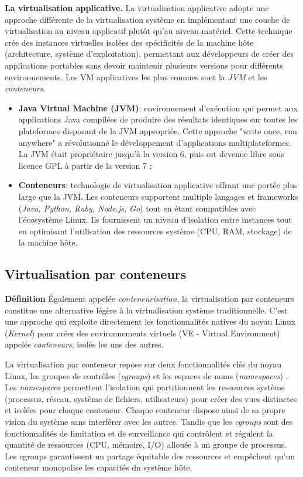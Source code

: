 \textbf{La virtualisation applicative.}
La virtualisation applicative adopte une approche différente de la virtualisation système en implémentant une couche de virtualisation au niveau applicatif plutôt qu'au niveau matériel. Cette technique crée des instances virtuelles isolées des spécificités de la machine hôte (architecture, système d'exploitation), permettant aux développeurs de créer des applications portables sans devoir maintenir plusieurs versions pour différents environnements.
Les VM applicatives les plus connues sont la \textit{JVM} et les \textit{conteneurs}.
\begin{itemize}
    \item \textbf{Java Virtual Machine (JVM)}: environnement d'exécution qui permet aux applications Java compilées de produire des résultats identiques sur toutes les plateformes disposant de la JVM appropriée. Cette approche "write once, run anywhere" a révolutionné le développement d'applications multiplateformes. La JVM était propriétaire jusqu'à la version 6, puis est devenue libre sous licence GPL à partir de la version 7 \cite{jayasena2015auto};
    \item \textbf{Conteneurs}: technologie de virtualisation applicative offrant une portée plus large que la JVM. Les conteneurs supportent multiple langages et frameworks (\textit{Java, Python, Ruby, Node.js, Go}) tout en étant compatibles avec l'écosystème Linux. Ils fournissent un niveau d'isolation entre instances tout en optimisant l'utilisation des ressources système (CPU, RAM, stockage) de la machine hôte. 
\end{itemize}

\subsection{Virtualisation par conteneurs}

\textbf{Définition}
Également appelée \textit{conteneurisation}, la virtualisation par conteneurs constitue une alternative légère à la virtualisation système traditionnelle. C'est une approche qui exploite directement les fonctionnalités natives du noyau Linux (\textit{Kernel}) pour créer des environnements virtuels (VE - Virtual Environment) appelés \textit{conteneurs}, isolés les uns des autres.

La virtualisation par conteneur repose sur deux fonctionnalités clés du noyau Linux, les groupes de contrôles (\textit{cgroups}) et les espaces de noms (\textit{namespaces}) \cite{moga2016level}. Les \textit{namespaces} permettent l'isolation qui partitionnent les ressources système (processus, réseau, système de fichiers, utilisateurs) pour créer des vues distinctes et isolées pour chaque conteneur. Chaque conteneur dispose ainsi de sa propre vision du système sans interférer avec les autres. Tandis que les \textit{cgroups} sont des fonctionnalités de limitation et de surveillance qui contrôlent et régulent la quantité de ressources (CPU, mémoire, I/O) allouée à un groupe de processus. Les cgroups garantissent un partage équitable des ressources et empêchent qu'un conteneur monopolise les capacités du système hôte.

